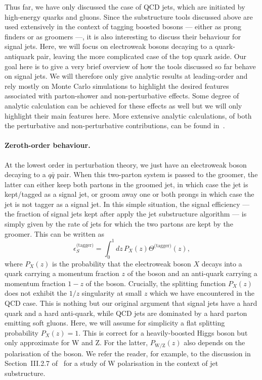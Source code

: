 Thus far, we have only discussed the case of QCD jets, which are initiated by
high-energy quarks and gluons. Since the substructure tools discussed
above are used extensively in the context of tagging boosted bosons ---
either as prong finders or as groomers ---, it is also interesting to
discuss their behaviour for signal jets. Here, we will focus on
electroweak bosons decaying to a quark-antiquark pair, leaving the more complicated case of
the top quark aside.
%
Our goal here is to give a very brief overview of how the tools
discussed so far behave on signal jets. We will therefore only give
analytic results at leading-order and rely mostly on Monte Carlo
simulations to highlight the desired features associated with
parton-shower and non-perturbative effects. Some degree of analytic
calculation can be achieved for these effects as well but we will only
highlight their main features here.
%
More extensive analytic calculations, of both the perturbative and
non-perturbative contributions, can be found
in~\cite{Dasgupta:2015yua}.

\paragraph{Zeroth-order behaviour.}
%
At the lowest order in perturbation theory, we just have an
electroweak boson decaying to a $q\bar q$ pair. When this two-parton system
is passed to the groomer, the latter can either keep both partons in
the groomed jet, in which case the jet is kept/tagged as a signal jet,
or groom away one or both prongs in which case the jet is not tagger
as a signal jet. In this simple  situation, the signal efficiency ---
\ie the fraction of signal jets kept after apply the jet substructure algorithm --- is simply given
by the rate of jets for which the two partons are kept by the
groomer.
%
This can be written as
\begin{equation}\label{eq:grm-signal-base}
\epsilon_S^{\text{(tagger)}} = \int_0^1 dz\,P_X(z) \Theta^{\text{(tagger)}}(z),
\end{equation}
where $P_X(z)$ is the probability that the electroweak boson $X$
decays into a quark carrying a momentum fraction $z$ of the boson and
an anti-quark carrying a momentum fraction $1-z$ of the boson.
%
Crucially, the splitting function $P_X(z)$ does not exhibit the $1/z$
singularity at small $z$ which we have encountered in the QCD case. This is nothing but our
original argument that signal jets have a hard quark and a hard
anti-quark, while QCD jets are dominated by a hard parton emitting
soft gluons. Here, we will assume for simplicity a flat splitting
probability $P_X(z)=1$. This is correct for a heavily-boosted Higgs
boson but only approximate for W and Z. For the latter,
$P_\text{W/Z}(z)$ also depends on the polarisation of the boson. We refer the reader, for example, to
the discussion in Section~III.2.7 of~\cite{Bendavid:2018nar} for a
study of W polarisation in the context of jet substructure.


